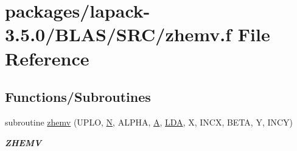 \hypertarget{lapack-3_85_80_2BLAS_2SRC_2zhemv_8f}{}\section{packages/lapack-\/3.5.0/\+B\+L\+A\+S/\+S\+R\+C/zhemv.f File Reference}
\label{lapack-3_85_80_2BLAS_2SRC_2zhemv_8f}
\subsection*{Functions/\+Subroutines}
\begin{DoxyCompactItemize}
\item 
subroutine \hyperlink{group__complex16__blas__level2_ga0a0a44bede5155c38da7cbca20880662}{zhemv} (U\+P\+L\+O, \hyperlink{polmisc_8c_a0240ac851181b84ac374872dc5434ee4}{N}, A\+L\+P\+H\+A, \hyperlink{classA}{A}, \hyperlink{example__user_8c_ae946da542ce0db94dced19b2ecefd1aa}{L\+D\+A}, X, I\+N\+C\+X, B\+E\+T\+A, Y, I\+N\+C\+Y)
\begin{DoxyCompactList}\small\item\em {\bfseries Z\+H\+E\+M\+V} \end{DoxyCompactList}\end{DoxyCompactItemize}
